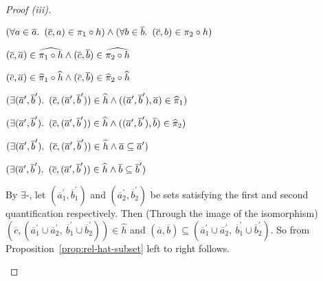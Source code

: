 \begin{prop}
\begin{proof}[Proof (iii)]
\begin{itemize}
      \step[\iffs]
        $(\forall a\in\overline{a}\ldotp~(\overline{c},a)\in\pi_1\circ h)\land(\forall b\in\overline{b}\ldotp~(\overline{c},b)\in\pi_2\circ h)$

      \step[\iffs]
        $(\overline{c},\overline{a})\in\widehat{\pi_1\circ h}\land(\overline{c},\overline{b})\in\widehat{\pi_2\circ h}$
        \marginnote{\Def-$~\widehat{\cdot}$}

      \step[\iffs]
        $(\overline{c},\overline{a})\in\widehat{\pi}_1\circ\widehat{h}\land(\overline{c},\overline{b})\in\widehat{\pi}_2\circ\widehat{h}$
        \marginnote{\Def-\ref{prop:rel-hat-comp}}

      \step[\iffs]
        $(\exists(\overline{a}^\prime,\overline{b}^\prime)\ldotp~(\overline{c},(\overline{a}^\prime,\overline{b}^\prime))\in\widehat{h}\land((\overline{a}^\prime,\overline{b}^\prime),\overline{a})\in\widehat{\pi}_1)$

      \addtolength{\itemsep}{-.2\baselineskip}
      \step[\land]
        $(\exists(\overline{a}^\prime,\overline{b}^\prime)\ldotp~(\overline{c},(\overline{a}^\prime,\overline{b}^\prime))\in\widehat{h}\land((\overline{a}^\prime,\overline{b}^\prime),\overline{b})\in\widehat{\pi}_2)$
      \addtolength{\itemsep}{.2\baselineskip}

      \step[\iffs]
        $(\exists(\overline{a}^\prime,\overline{b}^\prime)\ldotp~(\overline{c},(\overline{a}^\prime,\overline{b}^\prime))\in\widehat{h}\land\overline{a}\subseteq\overline{a}^\prime)$

      \addtolength{\itemsep}{-.2\baselineskip}
      \step[\land]
        $(\exists(\overline{a}^\prime,\overline{b}^\prime)\ldotp~(\overline{c},(\overline{a}^\prime,\overline{b}^\prime))\in\widehat{h}\land\overline{b}\subseteq\overline{b}^\prime)$
      \addtolength{\itemsep}{.2\baselineskip}

      \addtolength{\itemsep}{.5\baselineskip}
      \step
        By $\exists$-\Elim, let $(\overline{a}^\prime_1,\overline{b}^\prime_1)$ and $(\overline{a}^\prime_2,\overline{b}^\prime_2)$ be sets satisfying the first and second quantification respectively. Then (Through the image of the isomorphism) ${(\overline{c},(\overline{a}^\prime_1\cup\overline{a}^\prime_2,~\overline{b}^\prime_1\cup\overline{b}^\prime_2))\in\widehat{h}}$ and ${(\overline{a},\overline{b})\subseteq(\overline{a}^\prime_1\cup\overline{a}^\prime_2,~\overline{b}^\prime_1\cup\overline{b}^\prime_2)}$. So from Proposition~\ref{prop:rel-hat-subset} left to right follows.


\end{itemize}
\end{proof}
\end{prop}
